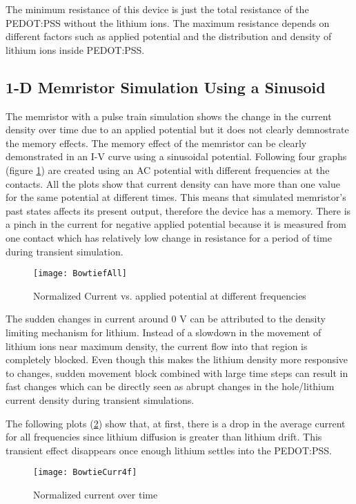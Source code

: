 \begin{doublespace}
The minimum resistance of this device is just the total resistance of the PEDOT:PSS without the lithium ions. The maximum resistance depends on different factors such as applied potential and the distribution and density of lithium ions inside PEDOT:PSS.

\clearpage
\subsection{1-D Memristor Simulation Using a Sinusoid}

The memristor with a pulse train simulation shows the change in the current density over time due to an applied potential but it does not clearly demnostrate the memory effects. The memory effect of the memristor can be clearly demonstrated in an I-V curve using a sinusoidal potential. Following four graphs (figure \ref{Bowtie}) are created using an AC potential with different frequencies at the contacts. All the plots show that current density can have more than one value for the same potential at different times. This means that simulated memristor's past states affects its present output, therefore the device has a memory. There is a pinch in the current for negative applied potential because it is measured from one contact which has relatively low change in resistance for a period of time during transient simulation. 

\begin{figure}[!htp]
\centering
\texttt{[image: BowtiefAll]}
\caption{Normalized Current vs. applied potential at different frequencies} 
\label{Bowtie}
\end{figure}

The sudden changes in current around 0 V can be attributed to the density limiting mechanism for lithium. Instead of a slowdown in the movement of lithium ions near maximum density, the current flow into that region is completely blocked. Even though this makes the lithium density more responsive to changes, sudden movement block combined with large time steps can result in fast changes which can be directly seen as abrupt changes in the hole/lithium current density during transient simulations.  

The following plots (\ref{BowtieCurr}) show that, at first, there is a drop in the average current for all frequencies since lithium diffusion is greater than lithium drift. This transient effect disappears once enough lithium settles into the PEDOT:PSS. 

\begin{figure}[!htp]
\centering
\texttt{[image: BowtieCurr4f]}
\caption{Normalized current over time} 
\label{BowtieCurr}
\end{figure}


\end{doublespace}
